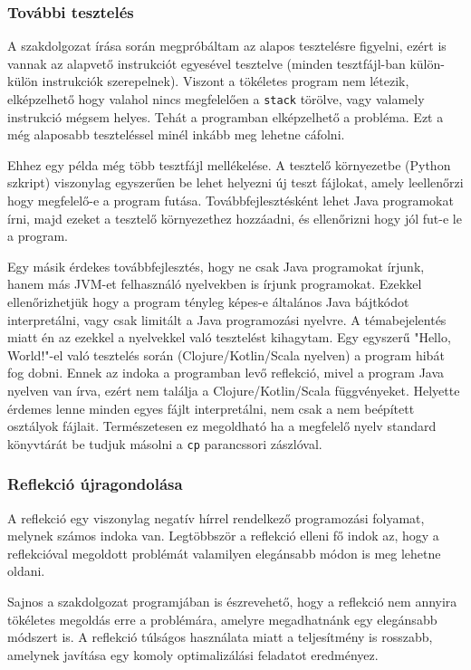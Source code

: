 \subsubsection{További tesztelés}

A szakdolgozat írása során megpróbáltam az alapos tesztelésre figyelni, ezért is vannak az alapvető instrukciót egyesével tesztelve (minden tesztfájl-ban külön-külön instrukciók szerepelnek). Viszont a tökéletes program nem létezik, elképzelhető hogy valahol nincs megfelelően a \lstinline{stack} törölve, vagy valamely instrukció mégsem helyes. Tehát a programban elképzelhető a probléma. Ezt a még alaposabb teszteléssel minél inkább meg lehetne cáfolni.

Ehhez egy példa még több tesztfájl mellékelése. A tesztelő környezetbe (Python szkript) viszonylag egyszerűen be lehet helyezni új teszt fájlokat, amely leellenőrzi hogy megfelelő-e a program futása. Továbbfejlesztésként lehet Java programokat írni, majd ezeket a tesztelő környezethez hozzáadni, és ellenőrizni hogy jól fut-e le a program.

Egy másik érdekes továbbfejlesztés, hogy ne csak Java programokat írjunk, hanem más JVM-et felhasználó nyelvekben is írjunk programokat. Ezekkel ellenőrizhetjük hogy a program tényleg képes-e általános Java bájtkódot interpretálni, vagy csak limitált a Java programozási nyelvre. A témabejelentés miatt én az ezekkel a nyelvekkel való tesztelést kihagytam. Egy egyszerű "Hello, World!"-el való tesztelés során (Clojure/Kotlin/Scala nyelven) a program hibát fog dobni. Ennek az indoka a programban levő reflekció, mivel a program Java nyelven van írva, ezért nem találja a Clojure/Kotlin/Scala függvényeket. Helyette érdemes lenne minden egyes fájlt interpretálni, nem csak a nem beépített osztályok fájlait. Természetesen ez megoldható ha a megfelelő nyelv standard könyvtárát be tudjuk másolni a \lstinline{cp} parancssori zászlóval.

\subsubsection{Reflekció újragondolása}

A reflekció egy viszonylag negatív hírrel rendelkező programozási folyamat, melynek számos indoka van. Legtöbbször a reflekció elleni fő indok az, hogy a reflekcióval megoldott problémát valamilyen elegánsabb módon is meg lehetne oldani.

Sajnos a szakdolgozat programjában is észrevehető, hogy a reflekció nem annyira tökéletes megoldás erre a problémára, amelyre megadhatnánk egy elegánsabb módszert is. A reflekció túlságos használata miatt a teljesítmény is rosszabb, amelynek javítása egy komoly optimalizálási feladatot eredményez.

